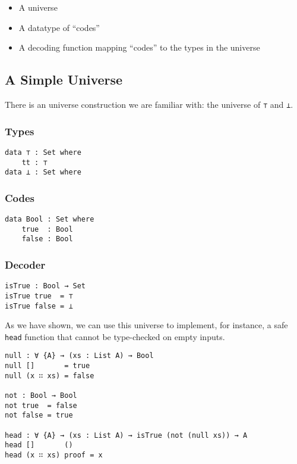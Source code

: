 \documentclass[\main/thesis.tex]{subfiles}
\begin{document}
\begin{itemize}
    \item A universe
    \item A datatype of ``codes''
    \item A decoding function mapping ``codes'' to the types in the universe
\end{itemize}

\subsection{A Simple Universe}

There is an universe construction we are familiar with: the universe
of \lstinline|⊤| and \lstinline|⊥|.

\subsubsection{Types}

\begin{lstlisting}
data ⊤ : Set where
    tt : ⊤
data ⊥ : Set where
\end{lstlisting}

\subsubsection{Codes}

\begin{lstlisting}
data Bool : Set where
    true  : Bool
    false : Bool
\end{lstlisting}

\subsubsection{Decoder}

\begin{lstlisting}
isTrue : Bool → Set
isTrue true  = ⊤
isTrue false = ⊥
\end{lstlisting}

As we have shown, we can use this universe to implement, for instance, a safe
\lstinline|head| function that cannot be type-checked on empty inputs.

\begin{lstlisting}
null : ∀ {A} → (xs : List A) → Bool
null []       = true
null (x ∷ xs) = false

not : Bool → Bool
not true  = false
not false = true

head : ∀ {A} → (xs : List A) → isTrue (not (null xs)) → A
head []       ()
head (x ∷ xs) proof = x
\end{lstlisting}
\end{document}

